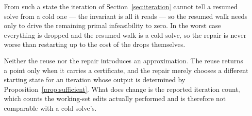 From such a state the iteration of Section~\ref{sec:iteration} cannot tell a
resumed solve from a cold one --- the invariant is all it reads --- so the resumed
walk needs only to drive the remaining primal infeasibility to zero. In the worst
case everything is dropped and the resumed walk is a cold solve, so the repair is
never worse than restarting up to the cost of the drops themselves.

\begin{remark}
Neither the reuse nor the repair introduces an approximation. The reuse returns a
point only when it carries a certificate, and the repair merely chooses a
different starting state for an iteration whose output is determined by
Proposition~\ref{prop:sufficient}. What does change is the reported iteration
count, which counts the working-set edits actually performed and is therefore not
comparable with a cold solve's.
\end{remark}
